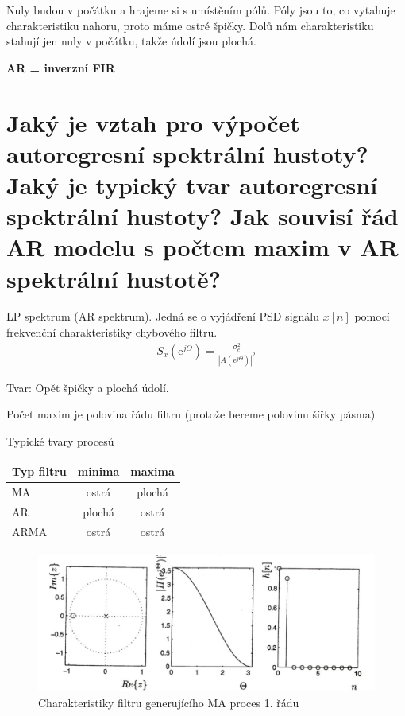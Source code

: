 \documentclass[a4paper,12pt]{article}   %
\newcommand{\mt}[1]{$#1$}
\newcommand{\ejt}{\text{e}^{j\Theta}}
\begin{document}
Nuly budou v počátku a hrajeme si s umístěním pólů. Póly jsou to, co vytahuje charakteristiku nahoru, proto máme ostré špičky. Dolů nám charakteristiku stahují jen nuly v počátku, takže údolí jsou plochá. 

\textbf{AR = inverzní FIR}


\section{Jaký je vztah pro výpočet autoregresní spektrální hustoty? Jaký je typický tvar autoregresní spektrální hustoty? Jak souvisí řád AR modelu s počtem maxim v AR spektrální hustotě?}

LP spektrum (AR spektrum). Jedná se o vyjádření PSD signálu \mt{x[n]} pomocí frekvenční charakteristiky chybového filtru. 
\begin{align*}
        S_x(\ejt) = \frac{\sigma^2_e}{|A(\ejt)|^2}
\end{align*}

Tvar: Opět špičky a plochá údolí.

Počet maxim je polovina řádu filtru (protože bereme polovinu šířky pásma) 


Typické tvary procesů
\begin{table}[h!]
        \centering
        \begin{tabular}{|l|c|c|}
                \hline
                Typ filtru & minima & maxima \\\hline\hline
                MA & ostrá & plochá \\\hline
                AR & plochá & ostrá \\\hline
                ARMA & ostrá & ostrá\\\hline
        \end{tabular}
\end{table}

\begin{figure}[h!]
        \centering
        \includegraphics[width=.6\textwidth]{fig/MA_filter.png}
        \caption*{Charakteristiky filtru generujícího MA proces 1. řádu}
        \label{fig:MA:filter}
\end{figure}
\end{document}
